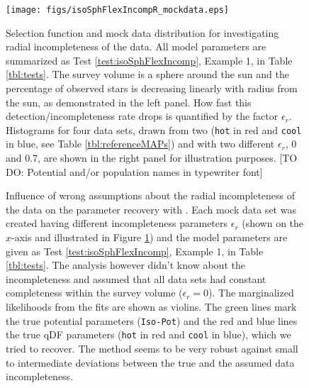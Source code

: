 
\begin{figure}
\texttt{[image: figs/isoSphFlexIncompR\_mockdata.eps]}
\caption{Selection function and mock data distribution for investigating radial incompleteness of the data. All model parameters are summarized as Test \ref{test:isoSphFlexIncomp}, Example 1, in Table \ref{tbl:tests}. The survey volume is a sphere around the sun and the percentage of observed stars is decreasing linearly with radius from the sun, as demonstrated in the left panel. How fast this detection/incompleteness rate drops is quantified by the factor $\epsilon_r$. Histograms for four data sets, drawn from two \MAPs{} (\texttt{hot} in red and \texttt{cool} in blue, see Table \ref{tbl:referenceMAPs}) and with two different $\epsilon_r$, 0 and 0.7, are shown in the right panel for illustration purposes. [TO DO: Potential and/or population names in typewriter font]} 
\label{fig:isoSphFlexIncompR_mockdata}
\end{figure}


\begin{figure}
\centering
{}
\caption{Influence of wrong assumptions about the radial incompleteness of the data on the parameter recovery with \RM{}. Each mock data set was created having different incompleteness parameters $\epsilon_r$ (shown on the $x$-axis and illustrated in Figure \ref{fig:isoSphFlexIncompR_mockdata}) and the model parameters are given as Test \ref{test:isoSphFlexIncomp}, Example 1, in Table \ref{tbl:tests}. The analysis however didn't know about the incompleteness and assumed that all data sets had constant completeness within the survey volume ($\epsilon_r = 0$). The marginalized likelihoods from the fits are shown as violins. The green lines mark the true potential parameters (\texttt{Iso-Pot}) and the red and blue lines the true qDF parameters (\texttt{hot} \MAP in red and \texttt{cool} \MAP in blue), which we tried to recover. The \RM{} method seems to be very robust against small to intermediate deviations between the true and the assumed data incompleteness.} 
\label{fig:isoSphFlexIncompR_violins}
\end{figure}

